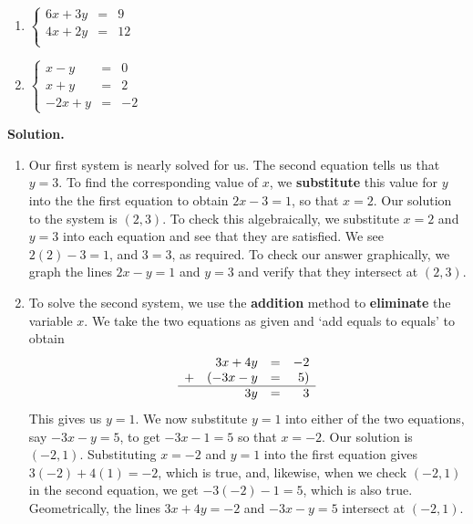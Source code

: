 \documentclass{ximera}
\begin{document}
\begin{ex}
\begin{multicols}{3}
\begin{enumerate}
\item  $\left\{ \begin{array}{rcr} 6x + 3y & = & 9 \\ 4x + 2y & = & 12 \\ \end{array} \right.$ 

\item  $\left\{ \begin{array}{rcr} x - y & = & 0 \\ x + y & = & 2 \\ -2x + y & = & -2 \end{array} \right.$

\end{enumerate}
\end{multicols}

{\bf Solution.}

\begin{enumerate}

\item  Our first system is nearly solved for us.  The second equation tells us that $y=3$.  To find the corresponding value of $x$, we \textbf{substitute} this value for $y$ into the the first equation to obtain $2x -  3 = 1$, so that $x = 2$.  Our solution to the system is $(2,3)$.  To check this algebraically, we substitute $x=2$ and $y=3$ into each equation and see that they are satisfied.  We see $2(2) - 3 = 1$, and $3=3$, as required.  To check our answer graphically, we graph the lines $2x-y = 1$ and $y=3$ and verify that they intersect at $(2,3)$.

\setlength{\extrarowheight}{2pt}

\item  To solve the second system, we use the \textbf{addition} method to \textbf{eliminate} the variable $x$.  We take the two equations as given and `add equals to equals' to obtain \[ \begin{array}{lrcr} & 3x+4y & = & -2  \\ + & (-3x-y  & = & 5 ) \\ \hline & 3y & = & 3\end{array}\] This gives us $y = 1$.  We now substitute $y=1$ into either of the two equations, say $-3x-y = 5$, to get $-3x-1 = 5$ so that $x = -2$.  Our solution is $(-2,1)$.  Substituting $x=-2$ and $y=1$ into the first equation gives $3(-2) + 4(1) = -2$, which is true, and, likewise, when we check $(-2, 1)$ in the second equation, we get $-3(-2) - 1 = 5$, which is also true.  Geometrically, the lines $3x+4y = -2$ and $-3x-y=5$ intersect at $(-2,1)$.


\end{enumerate}
\end{ex}
\end{document}
